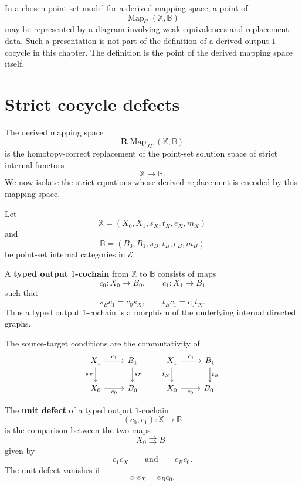 \begin{remark}
\label{rem:point-set-cocycle-representatives-rewritten}
In a chosen point-set model for a derived mapping space, a point of
\[
\operatorname{Map}_{\mathcal C}(\mathbb X,\mathbb B)
\]
may be represented by a diagram involving weak equivalences and
replacement data. Such a presentation is not part of the definition of a
derived output \(1\)-cocycle in this chapter. The definition is the point
of the derived mapping space itself.
\end{remark}

\section{Strict cocycle defects}
\label{sec:strict-cocycle-defects-rewritten}

The derived mapping space
\[
\mathbf R\!\operatorname{Map}_{JT}(\mathbb X,\mathbb B)
\]
is the homotopy-correct replacement of the point-set solution space of
strict internal functors
\[
\mathbb X\to\mathbb B.
\]
We now isolate the strict equations whose derived replacement is encoded
by this mapping space.

Let
\[
\mathbb X=(X_0,X_1,s_X,t_X,e_X,m_X)
\]
and
\[
\mathbb B=(B_0,B_1,s_B,t_B,e_B,m_B)
\]
be point-set internal categories in \(\mathcal E\).

\begin{definition}
\label{def:typed-output-one-cochain-rewritten}
A \textbf{typed output \(1\)-cochain} from \(\mathbb X\) to \(\mathbb B\)
consists of maps
\[
c_0:X_0\to B_0,
\qquad
c_1:X_1\to B_1
\]
such that
\[
s_Bc_1=c_0s_X,
\qquad
t_Bc_1=c_0t_X.
\]
Thus a typed output \(1\)-cochain is a morphism of the underlying
internal directed graphs.
\end{definition}

The source-target conditions are the commutativity of
\[
\begin{tikzcd}
X_1 \arrow[r, "c_1"] \arrow[d, "s_X"'] &
B_1 \arrow[d, "s_B"]
\\
X_0 \arrow[r, "c_0"'] &
B_0
\end{tikzcd}
\qquad
\begin{tikzcd}
X_1 \arrow[r, "c_1"] \arrow[d, "t_X"'] &
B_1 \arrow[d, "t_B"]
\\
X_0 \arrow[r, "c_0"'] &
B_0.
\end{tikzcd}
\]

\begin{definition}
\label{def:unit-defect-rewritten}
The \textbf{unit defect} of a typed output \(1\)-cochain
\[
(c_0,c_1):\mathbb X\to\mathbb B
\]
is the comparison between the two maps
\[
X_0\rightrightarrows B_1
\]
given by
\[
c_1e_X
\qquad
\text{and}
\qquad
e_Bc_0.
\]
The unit defect vanishes if
\[
c_1e_X=e_Bc_0.
\]
\end{definition}

